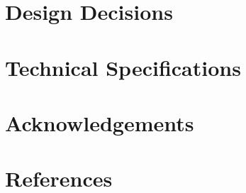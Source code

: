 \documentclass[
  format=manuscript,
  screen=true,
  review=false,
  nonacm=true,
  timestamp=true,
  balance=false]{acmart}
\begin{document}
\section{Design Decisions}



\section{Technical Specifications}

\section{Acknowledgements}

\section{References}




\end{document}

